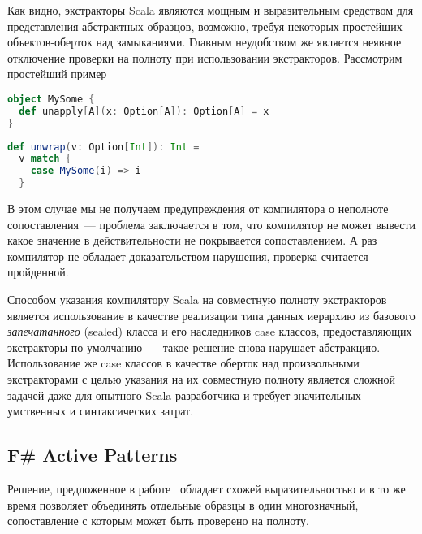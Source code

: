 Как видно, экстракторы Scala являются мощным и выразительным средством для представления абстрактных образцов, возможно, требуя некоторых простейших объектов-оберток над замыканиями. Главным неудобством же является неявное отключение проверки на полноту при использовании экстракторов. Рассмотрим простейший пример

\noindent
\begin{minipage}{\linewidth}
\begin{lstlisting}[language=scala]
object MySome {
  def unapply[A](x: Option[A]): Option[A] = x
}
\end{lstlisting}
\end{minipage}

\noindent
\begin{minipage}{\linewidth}
\begin{lstlisting}[language=scala]
def unwrap(v: Option[Int]): Int = 
  v match {
    case MySome(i) => i
  }
\end{lstlisting}
\end{minipage}

В этом случае мы не получаем предупреждения от компилятора о неполноте сопоставления~--- проблема заключается в том, что компилятор не может вывести какое значение в действительности не покрывается сопоставлением. А раз компилятор не обладает доказательством нарушения, проверка считается пройденной. 

Способом указания компилятору Scala на совместную полноту экстракторов является использование в качестве реализации типа данных иерархию из базового \textit{запечатанного} (sealed) класса и его наследников case классов, предоставляющих экстракторы по умолчанию~--- такое решение снова нарушает абстракцию. Использование же case классов в качестве оберток над произвольными экстракторами с целью указания на их совместную полноту является сложной задачей даже для опытного Scala разработчика и требует значительных умственных и синтаксических затрат. 


\subsection{F\# Active Patterns} \label{sec:active_patterns}
Решение, предложенное в работе~\cite{syme2007extensible} обладает схожей выразительностью и в то же время позволяет объединять отдельные образцы в один многозначный, сопоставление с которым может быть проверено на полноту. 

